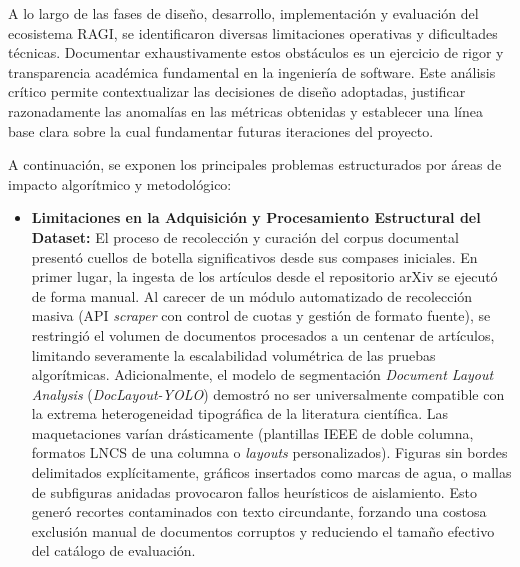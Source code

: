 \documentclass[a4paper]{report}
\begin{document}
A lo largo de las fases de diseño, desarrollo, implementación y evaluación del ecosistema RAGI, se identificaron diversas limitaciones operativas y dificultades técnicas. Documentar exhaustivamente estos obstáculos es un ejercicio de rigor y transparencia académica fundamental en la ingeniería de software. Este análisis crítico permite contextualizar las decisiones de diseño adoptadas, justificar razonadamente las anomalías en las métricas obtenidas y establecer una línea base clara sobre la cual fundamentar futuras iteraciones del proyecto. 

A continuación, se exponen los principales problemas estructurados por áreas de impacto algorítmico y metodológico:

\begin{itemize}
    \item \textbf{Limitaciones en la Adquisición y Procesamiento Estructural del Dataset:} El proceso de recolección y curación del corpus documental presentó cuellos de botella significativos desde sus compases iniciales. En primer lugar, la ingesta de los artículos desde el repositorio arXiv se ejecutó de forma manual. Al carecer de un módulo automatizado de recolección masiva (API \textit{scraper} con control de cuotas y gestión de formato fuente), se restringió el volumen de documentos procesados a un centenar de artículos, limitando severamente la escalabilidad volumétrica de las pruebas algorítmicas. Adicionalmente, el modelo de segmentación \textit{Document Layout Analysis} (\textit{DocLayout-YOLO}) demostró no ser universalmente compatible con la extrema heterogeneidad tipográfica de la literatura científica. Las maquetaciones varían drásticamente (plantillas IEEE de doble columna, formatos LNCS de una columna o \textit{layouts} personalizados). Figuras sin bordes delimitados explícitamente, gráficos insertados como marcas de agua, o mallas de subfiguras anidadas provocaron fallos heurísticos de aislamiento. Esto generó recortes contaminados con texto circundante, forzando una costosa exclusión manual de documentos corruptos y reduciendo el tamaño efectivo del catálogo de evaluación.


\end{itemize}
\end{document}

